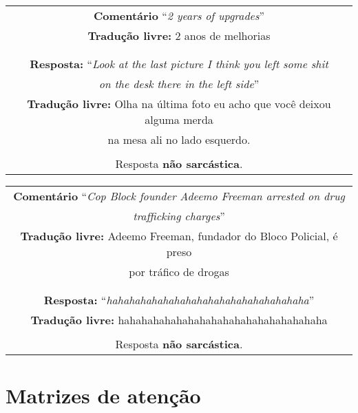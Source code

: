 \begin{center}
\begin{tabular}{|c|}

\hline

\textbf{Comentário} ``\textit{2 years of upgrades}'' \\

\textbf{Tradução livre:} 2 anos de melhorias \\ \\

\hline

\\

\textbf{Resposta:} ``\textit{Look at the last picture I think you left some shit} \\
\textit{on the desk there in the left side}'' \\

\textbf{Tradução livre:} Olha na última foto eu acho que você deixou alguma merda \\
na mesa ali no lado esquerdo. \\ \\

Resposta \textbf{não sarcástica}.

\\ \hline

\end{tabular}
\end{center}

\begin{center}
\begin{tabular}{|c|}

\hline

\textbf{Comentário} ``\textit{Cop Block founder Adeemo Freeman arrested on drug} \\
\textit{trafficking charges}'' \\

\textbf{Tradução livre:} Adeemo Freeman, fundador do Bloco Policial, é preso \\
por tráfico de drogas \\ \\

\hline

\\

\textbf{Resposta:} ``\textit{hahahahahahahahahahahahahahahahahaha}'' \\

\textbf{Tradução livre:} hahahahahahahahahahahahahahahahahaha \\ \\

Resposta \textbf{não sarcástica}.

\\ \hline

\end{tabular}
\end{center}

\section{Matrizes de atenção}%
\label{sec:matrizes_de_atencao}


